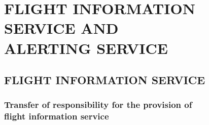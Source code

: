 
\chapterbegin

\section[Flight Information Service and Alerting Service]{FLIGHT INFORMATION SERVICE AND \\ ALERTING SERVICE}

\subsection[Flight information service]{FLIGHT INFORMATION SERVICE}


\subsubsection{Transfer of responsibility for the provision of \\ flight information service}